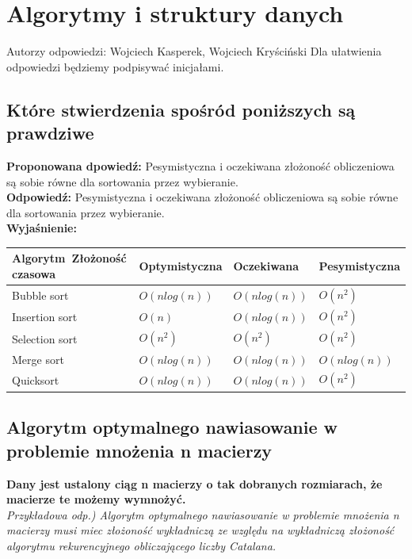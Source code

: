 \chapter{Algorytmy i struktury danych}
\PartialToc
Autorzy odpowiedzi: Wojciech Kasperek, Wojciech Kryściński
Dla ułatwienia odpowiedzi będziemy podpisywać inicjałami.

\section{Które stwierdzenia spośród poniższych są prawdziwe} 

\vspace{0.4cm}
\noindent \textbf{Proponowana dpowiedź:} Pesymistyczna i oczekiwana złożoność obliczeniowa są sobie równe dla sortowania przez wybieranie. \\ 
\noindent \textbf{Odpowiedź:} Pesymistyczna i oczekiwana złożoność obliczeniowa są sobie równe dla sortowania przez wybieranie. \\ 
\noindent \textbf{Wyjaśnienie:}
\begin{center}
	\begin{tabular}{ | l | l | l | l |}
		\hline
		Algorytm\ Złożoność czasowa& Optymistyczna & Oczekiwana & Pesymistyczna \\ \hline
		Bubble sort			& $O(nlog(n))$ & $O(nlog(n))$ & $O(n^2)$\\ \hline
		Insertion sort		& $O(n)$ & $O(nlog(n))$ &  $O(n^2)$\\ \hline
		Selection sort		& $O(n^2)$ & $O(n^2)$ & $O(n^2)$ \\ \hline
		Merge sort			& $O(nlog(n))$ & $O(nlog(n))$ & $O(nlog(n))$\\ \hline
		Quicksort			 & $O(nlog(n))$ & $O(nlog(n))$& $O(n^2)$ \\ \hline
	\end{tabular}
\end{center} 



\section{Algorytm optymalnego nawiasowanie w problemie mnożenia n macierzy}
\textbf{Dany jest ustalony ciąg n macierzy o tak dobranych rozmiarach, że macierze te możemy wymnożyć.}\\
\textit{Przykładowa odp.) Algorytm optymalnego nawiasowanie w problemie mnożenia n macierzy musi miec złożoność wykładniczą ze względu na wykładniczą złożoność algorytmu rekurencyjnego obliczającego liczby Catalana.}

